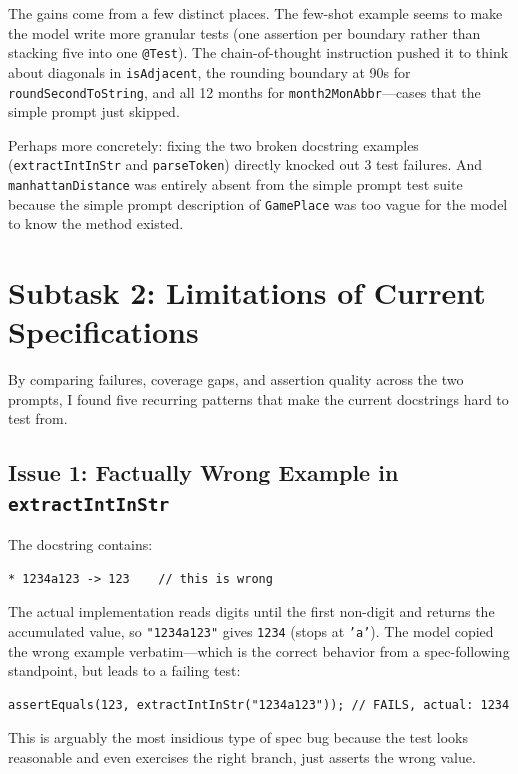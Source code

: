\documentclass[acmsmall,nonacm]{acmart}
\begin{document}
The gains come from a few distinct places. The few-shot example seems to make the model
write more granular tests (one assertion per boundary rather than stacking five into
one \texttt{@Test}). The chain-of-thought instruction pushed it to think about diagonals in
\texttt{isAdjacent}, the rounding boundary at 90s for \texttt{roundSecondToString},
and all 12 months for \texttt{month2MonAbbr}---cases that the simple prompt just skipped.

Perhaps more concretely: fixing the two broken docstring examples (\texttt{extractIntInStr}
and \texttt{parseToken}) directly knocked out 3 test failures. And \texttt{manhattanDistance}
was entirely absent from the simple prompt test suite because the simple prompt description
of \texttt{GamePlace} was too vague for the model to know the method existed.

\section{Subtask 2: Limitations of Current Specifications}

By comparing failures, coverage gaps, and assertion quality across the two prompts,
I found five recurring patterns that make the current docstrings hard to test from.

\subsection{Issue 1: Factually Wrong Example in \texttt{extractIntInStr}}

The docstring contains:
\begin{lstlisting}[style=java, numbers=none]
* 1234a123 -> 123    // this is wrong
\end{lstlisting}

The actual implementation reads digits until the first non-digit and returns the accumulated
value, so \texttt{"1234a123"} gives \texttt{1234} (stops at \texttt{'a'}). The model copied the
wrong example verbatim---which is the correct behavior from a spec-following standpoint, but
leads to a failing test:
\begin{lstlisting}[style=java, numbers=none]
assertEquals(123, extractIntInStr("1234a123")); // FAILS, actual: 1234
\end{lstlisting}

This is arguably the most insidious type of spec bug because the test looks reasonable and
even exercises the right branch, just asserts the wrong value.
\end{document}
